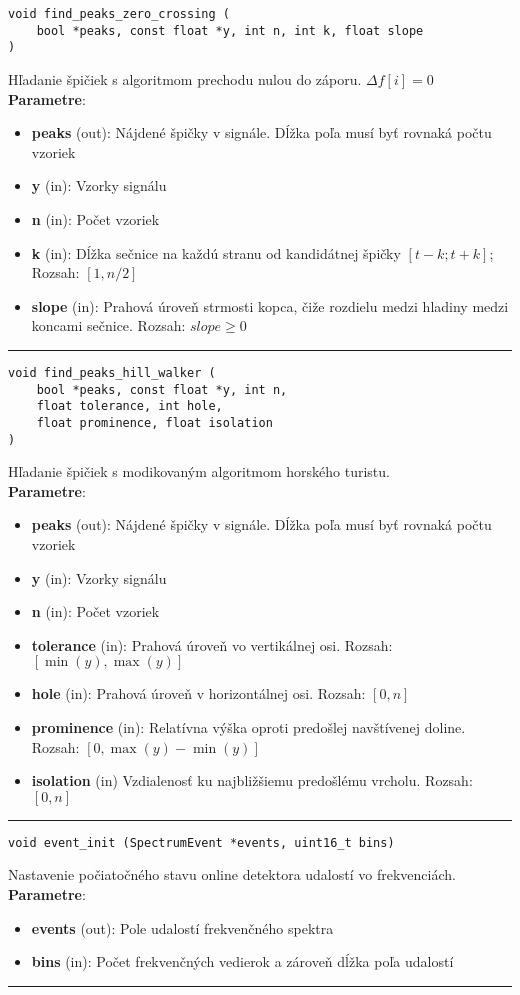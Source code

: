 \begin{lstlisting}[style=docs]
void find_peaks_zero_crossing (
	bool *peaks, const float *y, int n, int k, float slope
)
\end{lstlisting}
   Hľadanie špičiek s algoritmom prechodu nulou do záporu. $\Delta f[i] = 0$ \\
\textbf{Parametre}:
\begin{itemize}[noitemsep, topsep=0pt]
	\item \textbf{peaks} (out): Nájdené špičky v signále. Dĺžka poľa musí byť rovnaká počtu vzoriek
	\item \textbf{y} (in): Vzorky signálu 
	\item \textbf{n} (in): Počet vzoriek 
	\item \textbf{k} (in): Dĺžka sečnice na každú stranu od kandidátnej špičky $[t-k; t+k]$; Rozsah: $[1, n / 2]$
	\item \textbf{slope} (in): Prahová úroveň strmosti kopca, čiže rozdielu medzi hladiny medzi koncami sečnice. Rozsah: $slope \geq 0 $
\end{itemize}
\bigbreak
\hrule
\newpage
\begin{lstlisting}[style=docs]
void find_peaks_hill_walker (
	bool *peaks, const float *y, int n, 
	float tolerance, int hole, 
	float prominence, float isolation
)
\end{lstlisting}
   Hľadanie špičiek s modikovaným algoritmom horského turistu. \\
\textbf{Parametre}:
\begin{itemize}[noitemsep, topsep=0pt]
	\item \textbf{peaks} (out): Nájdené špičky v signále. Dĺžka poľa musí byť rovnaká počtu vzoriek
	\item \textbf{y} (in): Vzorky signálu 
	\item \textbf{n} (in): Počet vzoriek 
	\item \textbf{tolerance} (in): Prahová úroveň vo vertikálnej osi. Rozsah: $[\min(y), \max(y)]$
 	\item \textbf{hole} (in): Prahová úroveň v horizontálnej osi. Rozsah: $[0, n]$
 	\item \textbf{prominence} (in):  Relatívna výška oproti predošlej navštívenej doline. Rozsah: $[0, \max(y) - \min(y)]$
 	\item \textbf{isolation} (in)  Vzdialenosť ku najbližšiemu predošlému vrcholu. Rozsah: $[0, n]$
\end{itemize}
\bigbreak
\hrule

\begin{lstlisting}[style=docs]
void event_init (SpectrumEvent *events, uint16_t bins)
\end{lstlisting}
   Nastavenie počiatočného stavu online detektora udalostí vo frekvenciách. \\
\textbf{Parametre}:
\begin{itemize}[noitemsep, topsep=0pt]
	\item \textbf{events} (out): Pole udalostí frekvenčného spektra
	\item \textbf{bins} (in): Počet frekvenčných vedierok a zároveň dĺžka poľa udalostí
\end{itemize}
\bigbreak
\hrule

